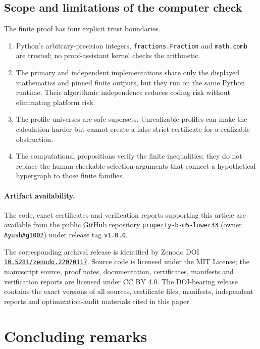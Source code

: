 \documentclass[11pt]{article}
\theoremstyle{remark}
\begin{document}
\subsection{Scope and limitations of the computer check}

The finite proof has four explicit trust boundaries.
\begin{enumerate}[leftmargin=2em]
\item Python's arbitrary-precision integers, \texttt{fractions.Fraction} and
      \texttt{math.comb} are trusted; no proof-assistant kernel checks the
      arithmetic.
\item The primary and independent implementations share only the displayed
      mathematics and pinned finite outputs, but they run on the same Python
      runtime.  Their algorithmic independence reduces coding risk without
      eliminating platform risk.
\item The profile universes are safe supersets.  Unrealizable profiles can
      make the calculation harder but cannot create a false strict
      certificate for a realizable obstruction.
\item The computational propositions verify the finite inequalities; they
      do not replace the human-checkable selection arguments that connect a
      hypothetical hypergraph to those finite families.
\end{enumerate}

\paragraph{Artifact availability.}
The code, exact certificates and verification reports supporting this article
are available from the public GitHub repository
\href{https://github.com/AyushAg1002/property-b-m5-lower33}%
{\texttt{property-b-m5-lower33}} (owner \texttt{AyushAg1002}) under release tag
\texttt{v1.0.0}.

\noindent The corresponding archival release is identified by Zenodo DOI
\href{https://doi.org/10.5281/zenodo.22070117}%
{\texttt{10.5281/zenodo.22070117}}.  Source code is licensed under the MIT
License; the manuscript source, proof notes, documentation, certificates,
manifests and verification reports are licensed under CC BY 4.0.  The
DOI-bearing release contains the exact versions of all sources, certificate
files, manifests, independent reports and optimization-audit materials cited
in this paper.

\section{Concluding remarks}
\end{document}
